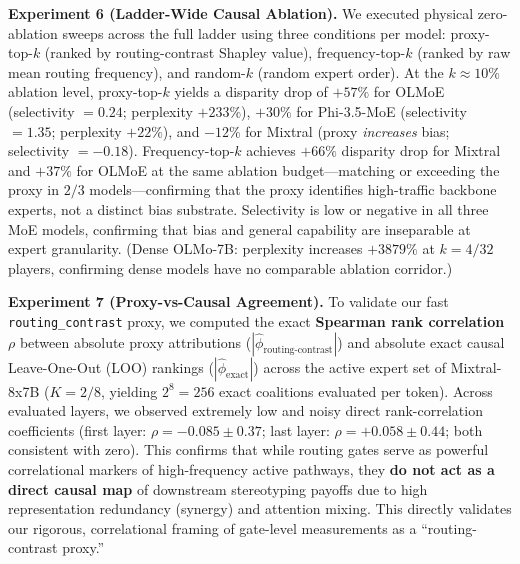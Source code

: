 \documentclass[11pt,a4paper]{article}
\begin{document}
\textbf{Experiment 6 (Ladder-Wide Causal Ablation).} We executed physical zero-ablation sweeps across the full ladder using three conditions per model: proxy-top-$k$ (ranked by routing-contrast Shapley value), frequency-top-$k$ (ranked by raw mean routing frequency), and random-$k$ (random expert order). At the $k \approx 10\%$ ablation level, proxy-top-$k$ yields a disparity drop of $+57\%$ for OLMoE (selectivity $= 0.24$; perplexity $+233\%$), $+30\%$ for Phi-3.5-MoE (selectivity $= 1.35$; perplexity $+22\%$), and $-12\%$ for Mixtral (proxy \emph{increases} bias; selectivity $= -0.18$). Frequency-top-$k$ achieves $+66\%$ disparity drop for Mixtral and $+37\%$ for OLMoE at the same ablation budget—matching or exceeding the proxy in $2/3$ models—confirming that the proxy identifies high-traffic backbone experts, not a distinct bias substrate. Selectivity is low or negative in all three MoE models, confirming that bias and general capability are inseparable at expert granularity. (Dense OLMo-7B: perplexity increases $+3879\%$ at $k=4/32$ players, confirming dense models have no comparable ablation corridor.)

\textbf{Experiment 7 (Proxy-vs-Causal Agreement).} To validate our fast \texttt{routing\_contrast} proxy, we computed the exact \textbf{Spearman rank correlation $\rho$} between absolute proxy attributions ($|\hat{\phi}_{\text{routing-contrast}}|$) and absolute exact causal Leave-One-Out (LOO) rankings ($|\hat{\phi}_{\text{exact}}|$) across the active expert set of Mixtral-8x7B ($K=2/8$, yielding $2^8 = 256$ exact coalitions evaluated per token). Across evaluated layers, we observed extremely low and noisy direct rank-correlation coefficients (first layer: $\rho = -0.085 \pm 0.37$; last layer: $\rho = +0.058 \pm 0.44$; both consistent with zero). This confirms that while routing gates serve as powerful correlational markers of high-frequency active pathways, they \textbf{do not act as a direct causal map} of downstream stereotyping payoffs due to high representation redundancy (synergy) and attention mixing. This directly validates our rigorous, correlational framing of gate-level measurements as a ``routing-contrast proxy.''
\end{document}
